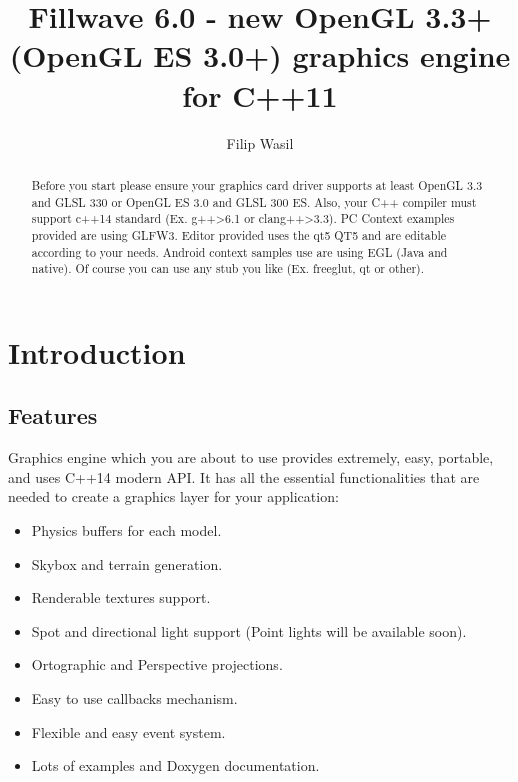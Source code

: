 \documentclass{article}
\begin{document}
\title{\textbf{Fillwave 6.0}
 - new OpenGL 3.3+ (OpenGL ES 3.0+) graphics engine for C++11 }
\author{Filip Wasil}

\maketitle

\begin{abstract}
Before you start please ensure your graphics card driver supports at least OpenGL 3.3 and GLSL 330 or OpenGL ES 3.0 and GLSL 300 ES. Also, your C++ compiler must support c++14 standard (Ex. g++\textgreater6.1 or clang++\textgreater3.3). PC Context examples provided are using GLFW3. Editor provided uses the qt5 QT5 and are editable according to your needs. Android context samples use are using EGL (Java and native). Of course you can use any stub you like (Ex. freeglut, qt or other).
\end{abstract}

\pagebreak
\tableofcontents

\newpage

\section{Introduction}
\subsection{Features}\label{sec:Features}
\indent \indent Graphics engine which you are about to use provides extremely, easy, portable, and uses C++14 modern API. It has all the essential functionalities that are needed to create a graphics layer for your application:

\begin{itemize}
  \item Physics buffers for each model.
  \item Skybox and terrain generation.
  \item Renderable textures support.
  \item Spot and directional light support (Point lights will be available soon).
  \item Ortographic and Perspective projections.
  \item Easy to use callbacks mechanism.
  \item Flexible and easy event system.
  \item Lots of examples and Doxygen documentation.
\end{itemize}
\end{document}
